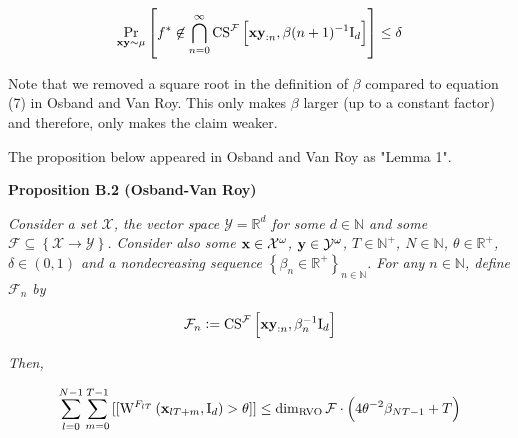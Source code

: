\documentclass[a4paper]{article}
\newcommand{\Co}[1]{}
\newcommand{\AP}[1]{\left(#1\right)}
\newcommand{\AB}[1]{\left[#1\right]}
\newcommand{\AC}[1]{\left\{#1\right\}}
\newcommand{\Pa}[2]{\underset{#1}{\operatorname{Pr}}\AB{#2}}
\newcommand{\Nats}{\mathbb{N}}
\newcommand{\Reals}{\mathbb{R}}
\newcommand{\Id}{\mathrm{I}}
\newcommand{\X}{\mathcal{X}}
\newcommand{\Y}{\mathcal{Y}}
\newcommand{\F}{\mathcal{F}}
\DeclareMathOperator{\RVO}{\dim_{RVO}}
\newcommand{\CS}{\mathrm{CS}}
\newcommand{\W}{\mathrm{W}}
\begin{document}
$$\Pa{\bold{xy}\sim\mu}{f^*\not\in\bigcap_{n=0}^\infty\CS^\F\AB{\bold{xy}_{:n},\beta(n+1)^{-1}\Id_d}} \leq \delta$$

Note that we removed a square root in the definition of $\beta$ compared to equation (7) in Osband and Van Roy. This only makes $\beta$ larger (up to a constant factor) and therefore, only makes the claim weaker.

The proposition below appeared in Osband and Van Roy as "Lemma 1".

\textbf{Proposition B.2 (Osband-Van Roy)}\Co{b}

\textit{Consider a set $\X$, the vector space $\Y=\Reals^d$ for some $d\in\Nats$ and some $\F\subseteq\AC{\X\rightarrow\Y}$. Consider also some $\bold{x}\in\X^\omega$, $\bold{y}\in\Y^\omega$, $T\in\Nats^+$, $N\in\Nats$, $\theta\in\Reals^+$, $\delta\in(0,1)$ and a nondecreasing sequence $\AC{\beta_n\in\Reals^+}_{n\in\Nats}$. For any $n\in\Nats$, define $\F_n$ by}\Co{i}

$$\F_n:=\CS^\F\AB{\bold{xy}_{:n},\beta_n^{-1}\Id_d}$$

\textit{Then,}\Co{i}

$$\sum_{l=0}^{N-1}\sum_{m=0}^{T-1}{[[\W^{F_{lT}}\AP{\bold{x}_{lT+m},\Id_d}>\theta]]} \leq \RVO{\F}\cdot\AP{4\theta^{-2}\beta_{NT-1}+T}$$
\end{document}
